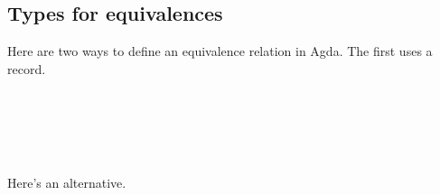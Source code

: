 \documentclass[sigplan,screen]{acmart}
\begin{document}
\subsection{Types for equivalences}\label{types-for-equivalences}
Here are two ways to define an equivalence relation in Agda. The first uses a record.

\begin{code}\>[0]\AgdaSpace{}%
\AgdaSpace{}%
\AgdaSymbol{\{}\AgdaSpace{}%
\AgdaSymbol{:}\AgdaSpace{}%
\AgdaSymbol{\}}\AgdaSpace{}%
\AgdaSymbol{\{}\AgdaSpace{}%
\AgdaSymbol{:}\AgdaSpace{}%
\AgdaSpace{}%
\AgdaSpace{}%
\AgdaSymbol{\}}\AgdaSpace{}%
\AgdaSymbol{(}\AgdaSpace{}%
\AgdaSymbol{:}\AgdaSpace{}%
\AgdaSpace{}%
\AgdaSpace{}%
\AgdaSymbol{)}\AgdaSpace{}%
\AgdaSymbol{:}\AgdaSpace{}%
\AgdaSpace{}%
\AgdaSpace{}%
\AgdaSpace{}%
\AgdaSpace{}%
\<%
\\
\>[0][@{}l@{\AgdaIndent{0}}]%
\>[2]\<%
\\
\>[2][@{}l@{\AgdaIndent{0}}]%
\>[4]%
\>[9]\AgdaSymbol{:}\AgdaSpace{}%
\AgdaSpace{}%
\<%
\\
%
\>[4]%
\>[10]\AgdaSymbol{:}\AgdaSpace{}%
\AgdaSpace{}%
\<%
\\
%
\>[4]\AgdaSpace{}%
\AgdaSymbol{:}\AgdaSpace{}%
\AgdaSpace{}%
\<%
\end{code}

Here's an alternative.
\end{document}

